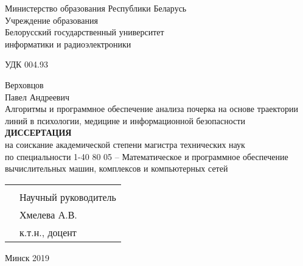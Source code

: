 \begin{titlepage}
  \begin{center}
    Министерство образования Республики Беларусь\\
    Учреждение образования\\
    Белорусский государственный университет \\
    информатики и радиоэлектроники\\[1em]

    \begin{flushleft}
        УДК 004.93
    \end{flushleft}
    Верховцов \\
    Павел Андреевич \\[1em]

    Алгоритмы и программное обеспечение анализа почерка на основе траектории линий в психологии, медицине и информационной безопасности\\[2em]

    \textbf{ДИССЕРТАЦИЯ}\\
    {на соискание академической степени магистра технических наук}\\[2em]
    
    {по специальности 1-40 80 05 – Математическое и программное обеспечение вычислительных  машин, комплексов и компьютерных сетей}\\[3em]

    \begin{tabular}{ p{}p{} }
      &  \\[1em]
      & Научный руководитель \\
      & Хмелева А.В.\\
      & к.т.н., доцент \\[3em]
    \end{tabular}

    \vfill
    {\normalsize Минск 2019}
  \end{center}
\end{titlepage}
